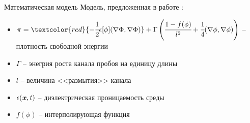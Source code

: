 \begin{frame}{Математическая модель}
Модель, предложенная в работе \cite{pitike_dielectric_breakdown}:
\begin{itemize}
	\item $\pi = \textcolor{red}{-\cfrac{1}{2} \epsilon[\phi] (\nabla \Phi, \nabla \Phi)} +
	\Gamma \left( \cfrac{1 - f(\phi)}{l^2} + \cfrac{1}{4} (\nabla \phi, \nabla \phi) \right)$
	-- плотность свободной энергии
	\item $\Gamma$ -- энегрия роста канала пробоя на единицу длины
	\item $l$ -- величина <<размытия>> канала
	\item $\epsilon({\textbf{\textit{x}}}, t)$ -- диэлектрическая проницаемость среды
	\item $f(\phi)$ -- интерполирующая функция
\end{itemize}
\end{frame}


